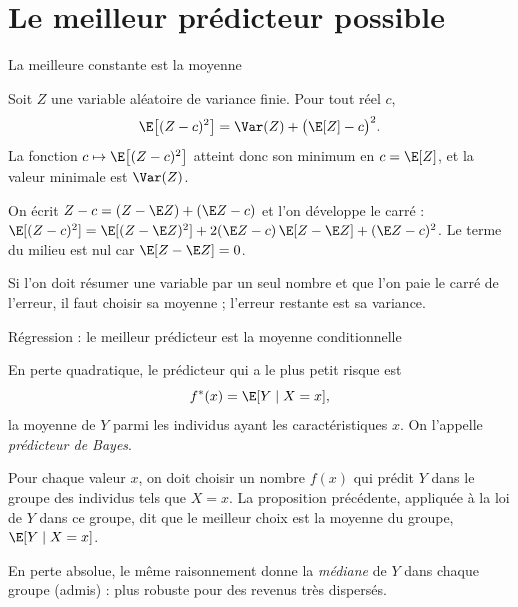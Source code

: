 \documentclass[aspectratio=169,11pt]{beamer}
\begin{document}
\section{Le meilleur prédicteur possible}

\begin{frame}{La meilleure constante est la moyenne}
  \begin{proposition}
    Soit $Z$ une variable aléatoire de variance finie. Pour tout réel $c$,
    \[
      \E\big[(Z-c)^2\big]=\Var(Z)+\big(\E[Z]-c\big)^2 .
    \]
    La fonction $c\mapsto\E\big[(Z-c)^2\big]$ atteint donc son minimum en $c=\E[Z]$, et la valeur minimale est $\Var(Z)$.
  \end{proposition}
  \begin{preuve}
    On écrit $Z-c=(Z-\E Z)+(\E Z-c)$ et l'on développe le carré :
    $\E[(Z-c)^2]=\E[(Z-\E Z)^2]+2(\E Z-c)\,\E[Z-\E Z]+(\E Z-c)^2$.
    Le terme du milieu est nul car $\E[Z-\E Z]=0$.
  \end{preuve}
  \begin{remarque}[Lecture]
    Si l'on doit résumer une variable par un seul nombre et que l'on paie le carré de l'erreur, il faut choisir sa moyenne ; l'erreur restante est sa variance.
  \end{remarque}
\end{frame}

\begin{frame}{Régression : le meilleur prédicteur est la moyenne conditionnelle}
  \begin{theoreme}
    En perte quadratique, le prédicteur qui a le plus petit risque est
    \[
      f^*(x)=\E[Y\mid X=x],
    \]
    la moyenne de $Y$ parmi les individus ayant les caractéristiques $x$. On l'appelle \emph{prédicteur de Bayes}.
  \end{theoreme}
  \begin{preuve}[(idée)]
    Pour chaque valeur $x$, on doit choisir un nombre $f(x)$ qui prédit $Y$ dans le groupe des individus tels que $X=x$.
    La proposition précédente, appliquée à la loi de $Y$ dans ce groupe, dit que le meilleur choix est la moyenne du groupe, $\E[Y\mid X=x]$.
  \end{preuve}
  \begin{remarque}
    En perte absolue, le même raisonnement donne la \emph{médiane} de $Y$ dans chaque groupe (admis) : plus robuste pour des revenus très dispersés.
  \end{remarque}
\end{frame}
\end{document}
